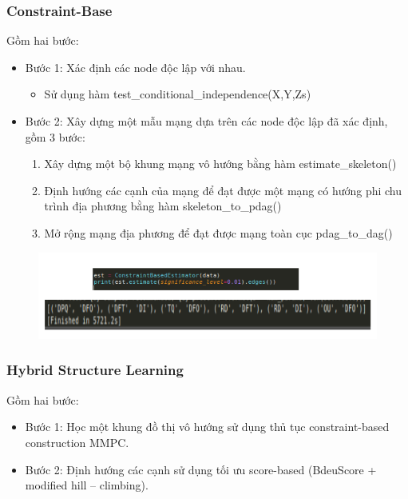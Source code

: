 \documentclass[12pt]{report}
\begin{document}
\subsubsection{Constraint-Base}
Gồm hai bước: 
\begin{itemize}
\item Bước 1: Xác định các node độc lập với nhau.
\begin{itemize}
\item Sử dụng hàm test\_conditional\_independence(X,Y,Zs)
\end{itemize}
\item Bước 2: Xây dựng một mẫu mạng dựa trên các node độc lập đã xác định, gồm 3 bước:
\begin{enumerate}
\item Xây dựng một bộ khung mạng vô hướng bằng hàm estimate\_skeleton()
\item Định hướng các cạnh của mạng để đạt được một mạng có hướng phi chu trình địa phương bằng hàm skeleton\_to\_pdag()
\item Mở rộng mạng địa phương để đạt được mạng toàn cục pdag\_to\_dag()
\end{enumerate}
\end{itemize}
\begin{figure}[h]
\centering
\includegraphics[width=15cm]{constraint-base.png}
\end{figure}

\subsubsection{Hybrid Structure Learning}
Gồm hai bước:
\begin{itemize}
\item Bước 1: Học một khung đồ thị vô hướng sử dụng thủ tục constraint-based construction MMPC.
\item Bước 2: Định hướng các cạnh sử dụng tối ưu score-based (BdeuScore + modified hill – climbing).
\end{itemize}
\end{document}
